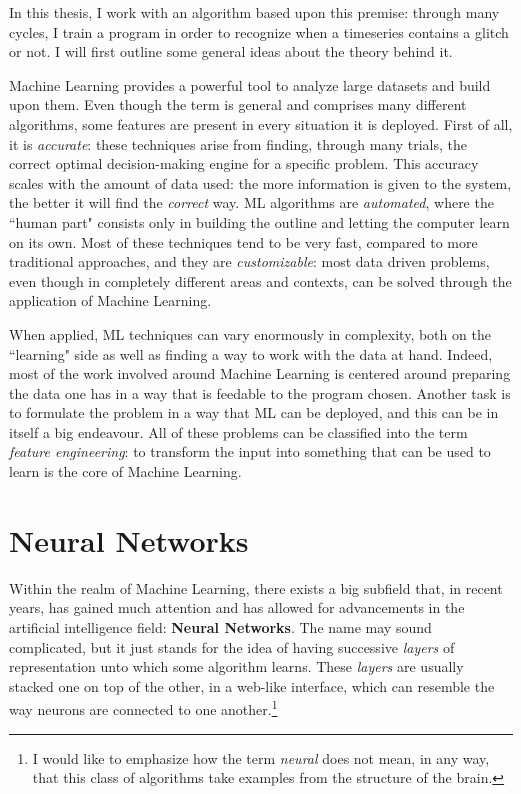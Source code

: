 \documentclass[12pt,a4paper,final]{book}			%
\begin{document}
		In this thesis, I work with an algorithm based upon this premise: through many cycles, I train a program in order to recognize when a timeseries contains a glitch or not. I will first outline some general ideas about the theory behind it.		
		
		Machine Learning provides a powerful tool to analyze large datasets and build upon them. Even though the term is general and comprises many different algorithms, some features are present in every situation it is deployed. 
		First of all, it is \textit{accurate}: these techniques arise from finding, through many trials, the correct optimal decision-making engine for a specific problem. This accuracy scales with the amount of data used: the more information is given to the system, the better it will find the \textit{correct} way.
		ML algorithms are \textit{automated}, where the ``human part" consists only in building the outline and letting the computer learn on its own. Most of these techniques tend to be very fast, compared to more traditional approaches, and they are \textit{customizable}: most data driven problems, even though in completely different areas and contexts, can be solved through the application of Machine Learning. 		
		
	When applied, ML techniques can vary enormously in complexity, both on the ``learning" side as well as finding a way to work with the data at hand. Indeed, most of the work involved around Machine Learning is centered around preparing the data one has in a way that is feedable to the program chosen. Another task is to formulate the problem in a way that ML can be deployed, and this can be in itself a big endeavour. All of these problems can be classified into the term \textit{feature engineering}: to transform the input into something that can be used to learn is the core of Machine Learning. 
		\cite{brink}
		
		\section{Neural Networks}\label{neural_net}
			Within the realm of Machine Learning, there exists a big subfield that, in recent years, has gained much attention and has allowed for advancements in the artificial intelligence field: \textbf{Neural Networks}. 
			The name may sound complicated, but it just stands for the idea of having successive \textit{layers} of representation unto which some algorithm learns. 			 
			These \textit{layers} are usually stacked one on top of the other, in a web-like interface, which can resemble the way neurons are connected to one another.\footnote{I would like to emphasize how the term \textit{neural} does not mean, in any way, that this class of algorithms take examples from the structure of the brain.}
			
\end{document}
